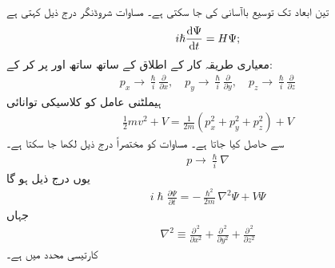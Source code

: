 


تین ابعاد تک توسیع  باآسانی کی جا سکتی ہے۔ مساوات شروڈنگر درج ذیل کہتی ہے
\begin{align}
i\hslash\frac{\dif{\Psi}}{\dif{t}}=H\Psi;
\end{align}
معیاری طریقہ کار کے اطلاق   کے ساتھ ساتھ  اور  پر  کر کے:
\begin{align}\label{مساوات_تین_ابعاد_عاملین_الف}
 p_{x}\to \frac{\hslash}{i}\frac{\partial}{\partial{x}},\quad p_{y}\to \frac{\hslash}{i}\frac{\partial}{\partial{y}},\quad p_{z}\to \frac{\hslash}{i}\frac{\partial}{\partial{z}} 
\end{align}
ہیملٹنی عامل  کو کلاسیکی توانائی
\begin{align*}
\frac{1}{2}mv^{2}+V=\frac{1}{2m}(p_{x}^{2}+p_{y}^{2}+p_{z}^{2})+V
\end{align*}
سے حاصل کیا جاتا ہے۔ مساوات  کو مختصراً درج ذیل لکھا  جا سکتا ہے۔
\begin{align}
p\to \frac{\hslash}{i}\nabla
\end{align}
یوں درج ذیل ہو گا
\begin{align}
i\hslash\frac{\partial{\Psi}}{\partial{t}}=-\frac{\hslash^{2}}{2m}\nabla^{2}\Psi+V\Psi
\end{align}
جہاں
\begin{align}
\nabla^{2}\equiv \frac{\partial^{\,2}}{\partial{x^2}}+\frac{\partial^{\,2}}{\partial{y^2}}+\frac{\partial^{\,2}}{\partial{z^2}} 
\end{align}
کارتیسی محدد میں  ہے۔


